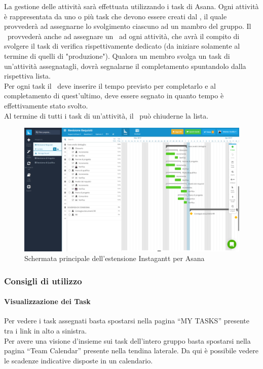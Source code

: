 \documentclass[../NormeDiProgetto.tex]{subfiles}
\begin{document}
			La gestione delle attività sarà effettuata utilizzando i task di Asana.
			Ogni attività è rappresentata da uno o più task che devono essere creati dal
			\responsabilediprogetto, il	quale provvederà ad assegnarne lo svolgimento ciascuno ad un mambro del gruppo. Il \responsabilediprogetto\ provvederà anche ad assegnare un \verificatore\ ad
			ogni attività, che avrà il compito di svolgere il task di verifica rispettivamente dedicato
			(da iniziare solamente al termine di quelli di "produzione").
			Qualora un membro svolga un task di un'attività assegnatagli, dovrà segnalarne il completamento
			spuntandolo dalla rispettiva lista.\\
			Per ogni task il \responsabilediprogetto\ deve inserire il tempo previsto per completarlo e al
			completamento di quest'ultimo, deve essere segnato in quanto tempo
			è effettivamente stato svolto.\\
			Al termine di tutti i task di un'attività, il \responsabilediprogetto\ può chiuderne la lista.
			\begin{figure} [h!]
				\centering
				\includegraphics[scale=0.2]{./Immagini/Instagantt.png}
				\caption{Schermata principale dell'estensione Instagantt per Asana}\label{}
			\end{figure}
			\subsubsection{Consigli di utilizzo}
				\paragraph{Visualizzazione dei Task\\}
					Per vedere i task assegnati basta spostarsi nella pagina ``MY
					TASKS'' presente tra i link in alto a sinistra.\\
					Per avere una visione d'insieme sui task dell'intero gruppo basta
					spostarsi nella pagina ``Team Calendar'' presente nella tendina
					laterale. Da qui è possibile vedere le scadenze indicative disposte
					in un calendario.
\end{document}
